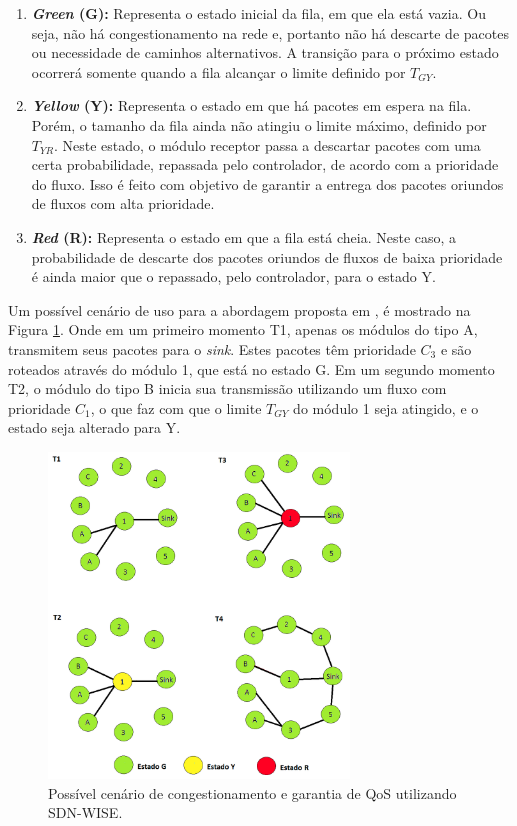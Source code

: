   \begin{enumerate}
    \item \textbf{\textit{Green} (G):} Representa o estado inicial da fila, em que ela está vazia. Ou seja, não há congestionamento na rede e, portanto não há descarte de pacotes ou necessidade de caminhos alternativos. A transição para o próximo estado ocorrerá somente quando a fila alcançar o limite definido por $T_{GY}$.
    \item \textbf{\textit{Yellow} (Y):} Representa o estado em que há pacotes em espera na fila. Porém, o tamanho da fila ainda não atingiu o limite máximo, definido por $T_{YR}$. Neste estado, o módulo receptor passa a descartar pacotes com uma certa probabilidade, repassada pelo controlador, de acordo com a prioridade do fluxo. Isso é feito com objetivo de garantir a entrega dos pacotes oriundos de fluxos com alta prioridade. 
    \item \textbf{\textit{Red} (R):} Representa o estado em que a fila está cheia. Neste caso, a probabilidade de descarte dos pacotes oriundos de fluxos de baixa prioridade é ainda maior que o repassado, pelo controlador, para o estado Y.
  \end{enumerate}

Um possível cenário de uso para a abordagem proposta em , é mostrado na Figura \ref{cenarioExemploSDNWISE_QOS}. Onde em um primeiro momento T1, apenas os módulos do tipo A, transmitem seus pacotes para o \textit{sink}. Estes pacotes têm prioridade $C_3$ e são roteados através do módulo 1, que está no estado G. Em um segundo momento T2, o módulo do tipo B inicia sua transmissão utilizando um fluxo com prioridade $C_1$, o que faz com que o limite $T_{GY}$ do módulo 1 seja atingido, e o estado seja alterado para Y.

\begin{figure}[!htb]
    \centering
    \includegraphics[width=8cm]{figs/novocenarioExemploSDNWISE_QOS.png}
    \caption{Possível cenário de congestionamento e garantia de \ac{QoS} utilizando SDN-WISE.}
    \label{cenarioExemploSDNWISE_QOS}
\end{figure}


